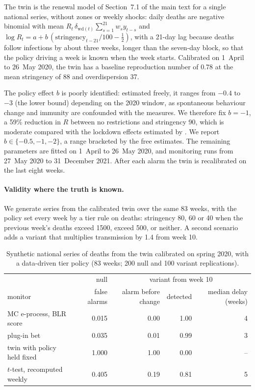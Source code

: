 The twin is the renewal model of Section~7.1 of the main text for
a single national series, without zones or weekly shocks: daily deaths are
negative binomial with mean $R_t\,\delta_{\mathrm{wd}(t)}\sum_{s=1}^{21} w_s y_{t-s}$
and $\log R_t = a + b\,(\mathrm{stringency}_{t-21}/100 - \tfrac12)$, with a
21-day lag because deaths follow infections by about three weeks, longer than
the seven-day block, so that the policy driving a week is known when the week
starts. Calibrated on 1~April to 26~May 2020, the twin has a baseline
reproduction number of 0.78 at the mean stringency of 88 and overdispersion
37.

The policy effect $b$ is poorly identified: estimated freely, it ranges from
$-0.4$ to $-3$ (the lower bound) depending on the 2020 window, as spontaneous
behaviour change and immunity are confounded with the measures. We therefore
fix $b = -1$, a 59\% reduction in $R$ between no restrictions and stringency
90, which is moderate compared with the lockdown effects estimated by
\citet{flaxman2020estimating}. We report $b \in \{-0.5, -1, -2\}$, a range
bracketed by the free estimates. The remaining parameters are fitted on
1~April to 26~May 2020, and monitoring runs from 27~May 2020 to 31~December
2021. After each alarm the twin is recalibrated on the last eight weeks.

\paragraph{Validity where the truth is known.} We generate series from the
calibrated twin over the same 83 weeks, with the policy set every week by a
tier rule on deaths: stringency 80, 60 or 40 when the previous week's deaths
exceed 1500, exceed 500, or neither. A second scenario adds a variant that
multiplies transmission by 1.4 from week 10.

\begin{table}[t]
\centering
\caption{Synthetic national series of deaths from the twin calibrated on
spring 2020, with a data-driven tier policy (83 weeks; 200 null and 100
variant replications).}
\label{tab:italy}
\begin{tabular}{lrrrr}
\toprule
 & null & \multicolumn{3}{c}{variant from week 10} \\
monitor & false alarms & alarm before change & detected & median delay (weeks) \\
\midrule
MC e-process, BLR score & 0.015 & 0.00 & 1.00 & 4 \\
plug-in bet & 0.035 & 0.01 & 0.99 & 3 \\
twin with policy held fixed & 1.000 & 1.00 & 0.00 & -- \\
$t$-test, recomputed weekly & 0.405 & 0.19 & 0.81 & 5 \\
\bottomrule
\end{tabular}
\end{table}

